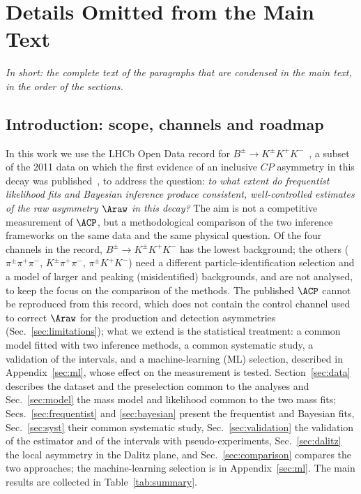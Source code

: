 \section{Details Omitted from the Main Text}
\label{app:details}
\emph{In short: the complete text of the paragraphs that are condensed in the main text, in the order of the sections.}

\subsection{Introduction: scope, channels and roadmap}
In this work we use the LHCb Open Data record for $B^{\pm}\to K^{\pm}K^{+}K^{-}$~\cite{opendata_record,opendata_notebook}, a subset of the 2011 data on which the first evidence of an inclusive $CP$ asymmetry in this decay was published~\cite{lhcb_cpv_2013}, to address the question: \emph{to what extent do frequentist likelihood fits and Bayesian inference produce consistent, well-controlled estimates of the raw asymmetry $\Araw$ in this decay?} The aim is not a competitive measurement of $\ACP$, but a methodological comparison of the two inference frameworks on the same data and the same physical question. Of the four channels in the record, $B^\pm\to K^\pm K^+K^-$ has the lowest background; the others ($\pi^\pm\pi^+\pi^-$, $K^\pm\pi^+\pi^-$, $\pi^\pm K^+K^-$) need a different particle-identification selection and a model of larger and peaking (misidentified) backgrounds, and are not analysed, to keep the focus on the comparison of the methods. The published $\ACP$ cannot be reproduced from this record, which does not contain the control channel used to correct $\Araw$ for the production and detection asymmetries (Sec.~\ref{sec:limitations}); what we extend is the statistical treatment: a common model fitted with two inference methods, a common systematic study, a validation of the intervals, and a machine-learning (ML) selection, described in Appendix~\ref{sec:ml}, whose effect on the measurement is tested. Section~\ref{sec:data} describes the dataset and the preselection common to the analyses and Sec.~\ref{sec:model} the mass model and likelihood common to the two mass fits; Secs.~\ref{sec:frequentist} and \ref{sec:bayesian} present the frequentist and Bayesian fits, Sec.~\ref{sec:syst} their common systematic study, Sec.~\ref{sec:validation} the validation of the estimator and of the intervals with pseudo-experiments, Sec.~\ref{sec:dalitz} the local asymmetry in the Dalitz plane, and Sec.~\ref{sec:comparison} compares the two approaches; the machine-learning selection is in Appendix~\ref{sec:ml}. The main results are collected in Table~\ref{tab:summary}.

